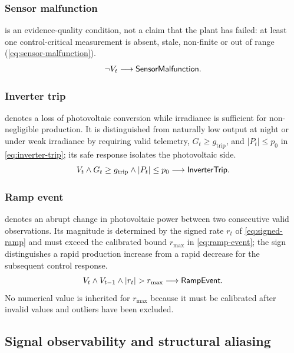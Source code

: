 \subsubsection{Sensor malfunction}

 is an evidence-quality condition, not a claim that the plant has failed: at least one control-critical measurement is absent, stale, non-finite or out of range (\autoref{eq:sensor-malfunction}).
\begin{equation}
\neg V_t \longrightarrow \textsf{SensorMalfunction}.
\label{eq:sensor-malfunction}
\end{equation}

\subsubsection{Inverter trip}

 denotes a loss of photovoltaic conversion while irradiance is sufficient for non-negligible production. It is distinguished from naturally low output at night or under weak irradiance by requiring valid telemetry, $G_t\geq g_{\mathrm{trip}}$, and $|P_t|\leq p_0$ in \autoref{eq:inverter-trip}; its safe response isolates the photovoltaic side.
\begin{equation}
V_t\wedge G_t\geq g_{\mathrm{trip}}\wedge |P_t|\leq p_0
\longrightarrow \textsf{InverterTrip}.
\label{eq:inverter-trip}
\end{equation}

\subsubsection{Ramp event}

 denotes an abrupt change in photovoltaic power between two consecutive valid observations. Its magnitude is determined by the signed rate $r_t$ of \autoref{eq:signed-ramp} and must exceed the calibrated bound $r_{\max}$ in \autoref{eq:ramp-event}; the sign distinguishes a rapid production increase from a rapid decrease for the subsequent control response.
\begin{equation}
V_t\wedge V_{t-1}\wedge |r_t|>r_{\max}
\longrightarrow \valueof{RampEvent}.
\label{eq:ramp-event}
\end{equation}
No numerical value is inherited for $r_{\max}$ because it must be calibrated after invalid values and outliers have been excluded.

\subsection{Signal observability and structural aliasing}

